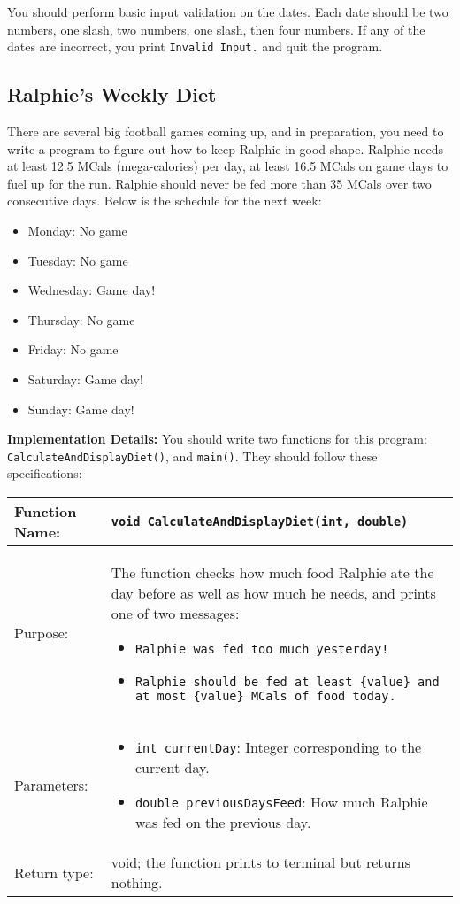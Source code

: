 You should perform basic input validation on the dates. Each date should be two numbers, one slash, two numbers, one slash, then four numbers. If any of the dates are incorrect, you print \texttt{Invalid Input.} and quit the program.

\subsection{Ralphie's Weekly Diet}

There are several big football games coming up, and in preparation, you need to write a program to figure out how to keep Ralphie in good shape. Ralphie needs at least 12.5 MCals (mega-calories) per day, at least 16.5 MCals on game days to fuel up for the run. Ralphie should never be fed more than 35 MCals over two consecutive days. Below is the schedule for the next week:
\begin{itemize}
    \item Monday: No game
    \item Tuesday: No game
    \item Wednesday: Game day!
    \item Thursday: No game
    \item Friday: No game
    \item Saturday: Game day!
    \item Sunday: Game day!
\end{itemize}

\textbf{Implementation Details:} You should write two functions for this program: \texttt{CalculateAndDisplayDiet()}, and \texttt{main()}. They should follow these specifications:

\begin{table}[H]
    \centering
    \begin{tabular}{|p{1.5in}|p{4.5in}|} \hline
        Function Name: & \texttt{void CalculateAndDisplayDiet(int, double)} \\ \hline
        Purpose: & The function checks how much food Ralphie ate the day before as well as how much he needs, and prints one of two messages:
        \begin{itemize}
        \item \texttt{Ralphie was fed too much yesterday!}
        \item \texttt{Ralphie should be fed at least \{value\} and at most \{value\} MCals of food today.}
    \end{itemize}\\
        Parameters: & \begin{itemize}
    \item \texttt{int currentDay}: Integer corresponding to the current day.
    \item \texttt{double previousDaysFeed}: How much Ralphie was fed on the previous day.
\end{itemize} \\
        Return type: & void; the function prints to terminal but returns nothing. \\ \hline
        
    \end{tabular}
\end{table}


